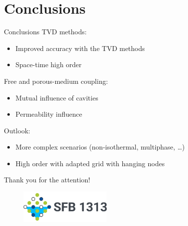 \documentclass{beamer}
\begin{document}
\section{Conclusions} %
\begin{frame}{Conclusions}
TVD methods:
\begin{itemize}
	\item Improved accuracy with the TVD methods
	\item Space-time high order
\end{itemize}
Free and porous-medium coupling:
\begin{itemize}
	\item Mutual influence of cavities
	\item Permeability influence
\end{itemize}
Outlook:
\begin{itemize}
	\item More complex scenarios (non-isothermal, multiphase, \dots)
	\item High order with adapted grid with hanging nodes
\end{itemize}
\end{frame}
\begin{frame}
	\centering
	{\LARGE Thank you for the attention!}
	\vspace{2cm}
	\begin{figure}
		\centering
		\includegraphics[width=0.4\textwidth]{logosfb.png}
	\end{figure}
	
\end{frame}
\appendix
\end{document}
